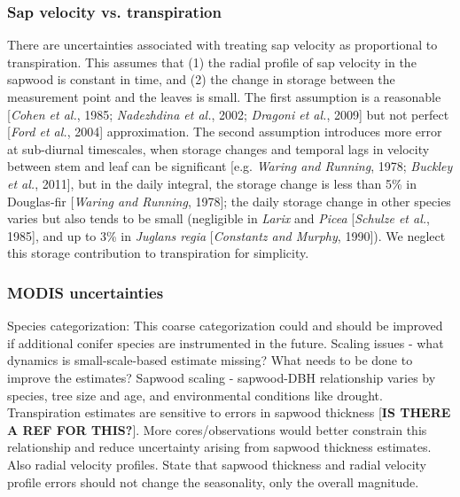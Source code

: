 \subsubsection{Sap velocity vs. transpiration}
There are uncertainties associated with treating sap velocity as proportional to transpiration.  This assumes that (1) the radial profile of sap velocity in the sapwood is constant in time, and (2) the change in storage between the measurement point and the leaves is small.  The first assumption is a reasonable [\textit{Cohen et al.}, 1985; \textit{Nadezhdina et al.}, 2002; \textit{Dragoni et al.}, 2009] but not perfect [\textit{Ford et al.}, 2004] approximation.  The second assumption introduces more error at sub-diurnal timescales, when storage changes and temporal lags in velocity between stem and leaf can be significant [e.g. \textit{Waring and Running}, 1978; \textit{Buckley et al.}, 2011], but in the daily integral, the storage change is less than 5\% in Douglas-fir [\textit{Waring and Running}, 1978]; the daily storage change in other species varies but also tends to be small (negligible in \textit{Larix} and \textit{Picea} [\textit{Schulze et al.}, 1985], and up to 3\% in \textit{Juglans regia} [\textit{Constantz and Murphy}, 1990]).  We neglect this storage contribution to transpiration for simplicity.

\subsubsection{MODIS uncertainties}
Species categorization: This coarse categorization could and should be improved if additional conifer species are instrumented in the future.
Scaling issues - what dynamics is small-scale-based estimate missing?  What needs to be done to improve the estimates?
Sapwood scaling - sapwood-DBH relationship varies by species, tree size and age, and environmental conditions like drought.  Transpiration estimates are sensitive to errors in sapwood thickness [\textbf{IS THERE A REF FOR THIS?}]. More cores/observations would better constrain this relationship and reduce uncertainty arising from sapwood thickness estimates.
Also radial velocity profiles.
State that sapwood thickness and radial velocity profile errors should not change the seasonality, only the overall magnitude.


